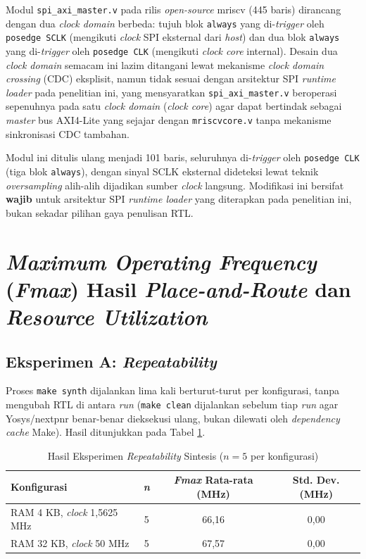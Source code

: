 Modul \texttt{spi\_axi\_master.v} pada rilis \textit{open-source} mriscv (445 baris) dirancang dengan dua \textit{clock domain} berbeda: tujuh blok \texttt{always} yang di-\textit{trigger} oleh \texttt{posedge SCLK} (mengikuti \textit{clock} SPI eksternal dari \textit{host}) dan dua blok \texttt{always} yang di-\textit{trigger} oleh \texttt{posedge CLK} (mengikuti \textit{clock core} internal). Desain dua \textit{clock domain} semacam ini lazim ditangani lewat mekanisme \textit{clock domain crossing} (CDC) eksplisit, namun tidak sesuai dengan arsitektur SPI \textit{runtime loader} pada penelitian ini, yang mensyaratkan \texttt{spi\_axi\_master.v} beroperasi sepenuhnya pada satu \textit{clock domain} (\textit{clock core}) agar dapat bertindak sebagai \textit{master} bus AXI4-Lite yang sejajar dengan \texttt{mriscvcore.v} tanpa mekanisme sinkronisasi CDC tambahan.

Modul ini ditulis ulang menjadi 101 baris, seluruhnya di-\textit{trigger} oleh \texttt{posedge CLK} (tiga blok \texttt{always}), dengan sinyal SCLK eksternal dideteksi lewat teknik \textit{oversampling} alih-alih dijadikan sumber \textit{clock} langsung. Modifikasi ini bersifat \textbf{wajib} untuk arsitektur SPI \textit{runtime loader} yang diterapkan pada penelitian ini, bukan sekadar pilihan gaya penulisan RTL.

\section{\textit{Maximum Operating Frequency} (\textit{Fmax}) Hasil \textit{Place-and-Route} dan \textit{Resource Utilization}}
\label{sec:fmax}

\subsection{Eksperimen A: \textit{Repeatability}}
\label{subsec:eksperimen-a}

Proses \texttt{make synth} dijalankan lima kali berturut-turut per konfigurasi, tanpa mengubah RTL di antara \textit{run} (\texttt{make clean} dijalankan sebelum tiap \textit{run} agar Yosys/nextpnr benar-benar dieksekusi ulang, bukan dilewati oleh \textit{dependency cache} Make). Hasil ditunjukkan pada Tabel \ref{Tab: Repeatability Fmax}.

\begin{table}[h]
	\centering
	\begin{tabular}{|l|c|c|c|}
		\hline
		\textbf{Konfigurasi} & \textbf{\textit{n}} & \textbf{\textit{Fmax} Rata-rata (MHz)} & \textbf{Std. Dev. (MHz)} \\
		\hline
		RAM 4 KB, \textit{clock} 1,5625 MHz & 5 & 66,16 & 0,00 \\ \hline
		RAM 32 KB, \textit{clock} 50 MHz & 5 & 67,57 & 0,00 \\ \hline
	\end{tabular}
	\vspace{0.5em}
	\caption{Hasil Eksperimen \textit{Repeatability} Sintesis ($n=5$ per konfigurasi)}
	\label{Tab: Repeatability Fmax}
\end{table}

